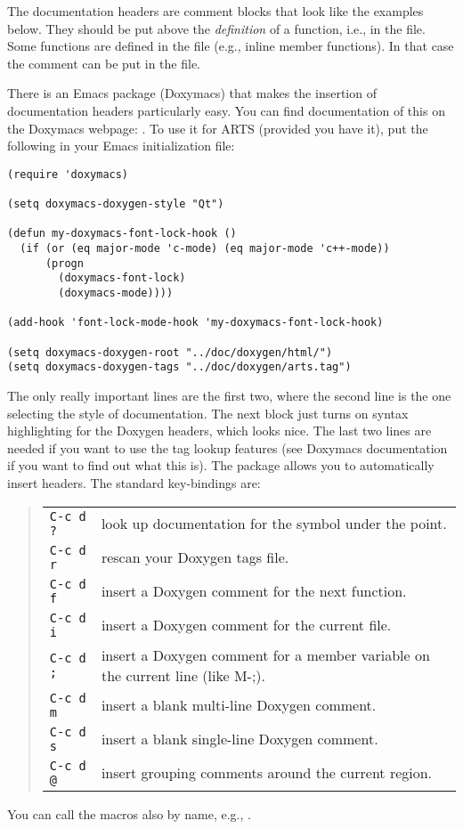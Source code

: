 The documentation headers are comment blocks that look like the
examples below. They should be put above the \emph{definition} of a
function, i.e., in the  file.  Some functions are defined in
the  file (e.g., inline member functions). In that case the
comment can be put in the  file.

There is an Emacs package (Doxymacs) that makes the insertion of
documentation headers particularly easy. You can find documentation of
this on the Doxymacs webpage: .
To use it for ARTS (provided you have it), put the following in your
Emacs initialization file:

\begin{verbatim}
(require 'doxymacs)

(setq doxymacs-doxygen-style "Qt")

(defun my-doxymacs-font-lock-hook ()
  (if (or (eq major-mode 'c-mode) (eq major-mode 'c++-mode))
      (progn
        (doxymacs-font-lock)
        (doxymacs-mode))))

(add-hook 'font-lock-mode-hook 'my-doxymacs-font-lock-hook)

(setq doxymacs-doxygen-root "../doc/doxygen/html/")
(setq doxymacs-doxygen-tags "../doc/doxygen/arts.tag")
\end{verbatim}

The only really important lines are the first two, where the second
line is the one selecting the style of documentation. The next block
just turns on syntax highlighting for the Doxygen headers, which looks
nice. The last two lines are needed if you want to use the tag lookup
features (see Doxymacs documentation if you want to find out what this
is).  The package allows you to automatically insert headers. The
standard key-bindings are:
\begin{quote}
\begin{tabularx}{.8\hsize}{@{}lX}
\texttt{C-c d ?} & look up documentation for the symbol under the point.\\
\texttt{C-c d r} & rescan your Doxygen tags file.\\
\texttt{C-c d f} & insert a Doxygen comment for the next function.\\
\texttt{C-c d i} & insert a Doxygen comment for the current file.\\
\texttt{C-c d ;} & insert a Doxygen comment for a member variable on the current line (like M-;).\\
\texttt{C-c d m} & insert a blank multi-line Doxygen comment.\\
\texttt{C-c d s} & insert a blank single-line Doxygen comment.\\
\texttt{C-c d @} & insert grouping comments around the current region.\\
\end{tabularx}
\end{quote}
You can call the macros also by name, e.g., .


